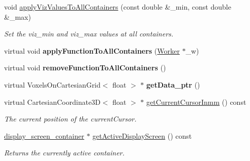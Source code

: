 \begin{DoxyCompactItemize}
void \mbox{\hyperlink{classscreen__manager__ProjData_af0ad4c677508a9b4448f2bca7e86a1e6}{apply\+Viz\+Values\+To\+All\+Containers}} (const double \&\+\_\+min, const double \&\+\_\+max)
\begin{DoxyCompactList}\small\item\em Set the viz\+\_\+min and viz\+\_\+max values at all containers. \end{DoxyCompactList}\item 
\mbox{\label{classscreen__manager__ProjData_a45694c58085eb42093ee8457e4c54db5}} 
virtual void {\bfseries apply\+Function\+To\+All\+Containers} (\mbox{\hyperlink{classWorker}{Worker}} $\ast$\+\_\+w)
\item 
\mbox{\label{classscreen__manager__ProjData_a9906e83cad94c9869f7f10a89568c0af}} 
virtual void {\bfseries remove\+Function\+To\+All\+Containers} ()
\item 
\mbox{\label{classscreen__manager__ProjData_a0545e6a6fc9a32ef01ca1baad5787d9b}} 
virtual Voxels\+On\+Cartesian\+Grid$<$ float $>$ $\ast$ {\bfseries get\+Data\+\_\+ptr} ()
\item 
\mbox{\label{classscreen__manager__ProjData_af44186503b9c822764d92c48c9cfe7ca}} 
virtual Cartesian\+Coordinate3D$<$ float $>$ $\ast$ \mbox{\hyperlink{classscreen__manager__ProjData_af44186503b9c822764d92c48c9cfe7ca}{get\+Current\+Cursor\+Inmm}} () const
\begin{DoxyCompactList}\small\item\em The current position of the current\+Cursor. \end{DoxyCompactList}\item 
\mbox{\label{classScreen__manager_a317d60e000518cd1af48d04dca139f43}} 
\mbox{\hyperlink{classdisplay__screen__container}{display\+\_\+screen\+\_\+container}} $\ast$ \mbox{\hyperlink{classScreen__manager_a317d60e000518cd1af48d04dca139f43}{get\+Active\+Display\+Screen}} () const
\begin{DoxyCompactList}\small\item\em Returns the currently active container. \end{DoxyCompactList}\item 
\mbox{\label{classScreen__manager_a35fad2826491912a33af8f6b5192abc4}} 

\end{DoxyCompactItemize}
